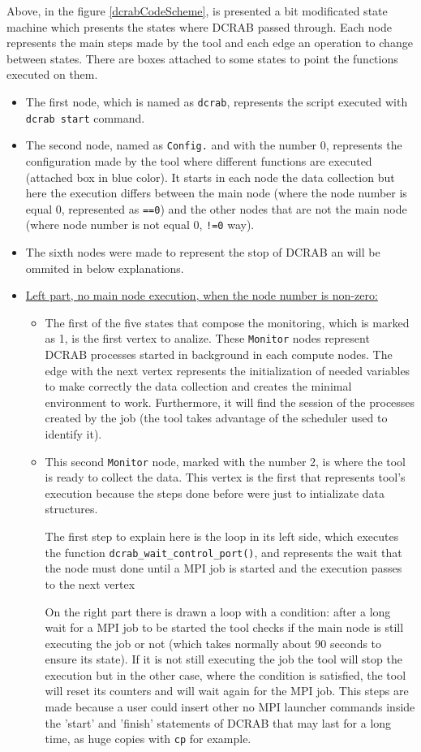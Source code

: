 \documentclass[10pt,a4paper]{report}
\begin{document}
Above, in the figure \ref{dcrabCodeScheme}, is presented a bit modificated state machine which presents the states where DCRAB passed through. Each node represents the main steps made by the tool and each edge an operation to change between states. There are boxes attached to some states to point the functions executed on them.

\begin{itemize}
  \item The first node, which is named as \verb+dcrab+, represents the script executed with \verb+dcrab start+ command.
  \item The second node, named as \verb+Config.+ and with the number 0, represents the configuration made by the tool where different functions are executed (attached box in blue color). It starts in each node the data collection but here the execution differs between the main node (where the node number is equal 0, represented as \verb+==0+) and the other nodes that are not the main node (where node number is not equal 0, \verb+!=0+ way).
  \item The sixth nodes were made to represent the stop of DCRAB an will be ommited in below explanations.
  \item \underline{Left part, no main node execution, when the node number is non-zero:}
  \begin{itemize}
    \item The first of the five states that compose the monitoring, which is marked as 1, is the first vertex to analize. These \verb+Monitor+ nodes represent DCRAB processes started in background in each compute nodes. The edge with the next vertex represents the initialization of needed variables to make correctly the data collection and creates the minimal environment to work. Furthermore, it will find the session of the processes created by the job (the tool takes advantage of the scheduler used to identify it).
    \item This second \verb+Monitor+ node, marked with the number 2, is where the tool is ready to collect the data. This vertex is the first that represents tool's execution because the steps done before were just to intializate data structures.

    The first step to explain here is the loop in its left side, which executes the function \texttt{dcrab\_wait\_control\_port()}, and represents the wait that the node must done until a MPI job is started and the execution passes to the next vertex

   On the right part there is drawn a loop with a condition: after a long wait for a MPI job to be started the tool checks if the main node is still executing the job or not (which takes normally about 90 seconds to ensure its state). If it is not still executing the job the tool will stop the execution but in the other case, where the condition is satisfied, the tool will reset its counters and will wait again for the MPI job. This steps are made because a user could insert other no MPI launcher commands inside the 'start' and 'finish' statements of DCRAB that may last for a long time, as huge copies with \verb+cp+ for example.


\end{itemize}
\end{itemize}
\end{document}
